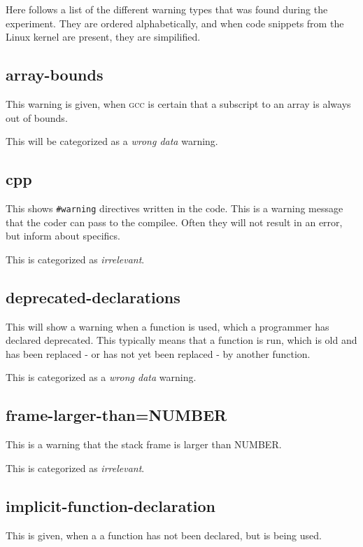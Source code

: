 \documentclass[a4paper,11pt]{report}
\newcommand{\textcode}[1]{\fboxsep=1pt\texttt{\colorbox{gray!20}{#1}}}
\newcommand{\figa}{
    \begin{figure}[!htpb]
    \centering
}
\newcommand{\figb}[2]{
    \caption{#1}
    \label{#2}
    \end{figure}
}
\begin{document}
Here follows a list of the different warning types that was found during the 
experiment.  They are ordered alphabetically, and when code snippets from the 
Linux kernel are present, they are simpilified.


            \subsection*{array-bounds}
This warning is given, when \textsc{gcc} is certain that a subscript to an array is always 
out of bounds.

This will be categorized as a \emph{wrong data} warning.




            \subsection*{cpp}
This shows \textcode{\#warning} directives written in the code. This is a warning
message that the coder can pass to the compilee. Often they will not result in 
an error, but inform about specifics.

This is categorized as \emph{irrelevant}.


            \subsection*{deprecated-declarations}
This will show a warning when a function is used, which a programmer has 
declared deprecated. This typically means that a function is run, which is old
and has been replaced - or has not yet been replaced - by another function.

This is categorized as a \emph{wrong data} warning.


            \subsection*{frame-larger-than=NUMBER}
This is a warning that the stack frame is larger than NUMBER.

This is categorized as \emph{irrelevant}.


            \subsection*{implicit-function-declaration}
This is given, when a a function has not been declared, but is being used.
\end{document}
